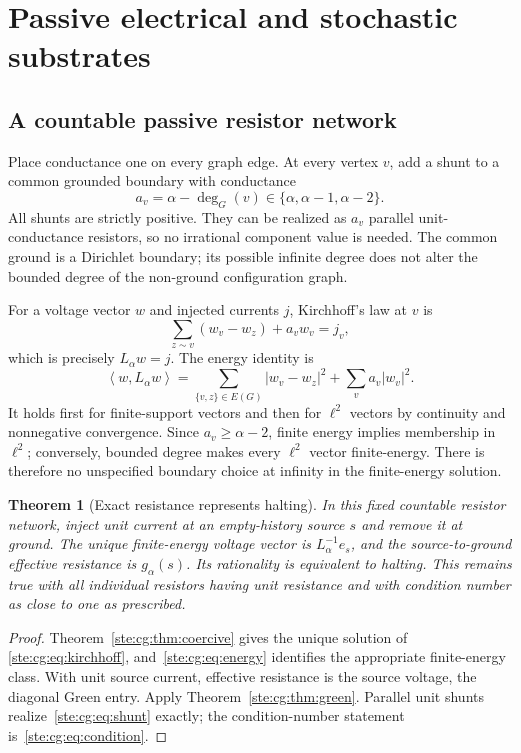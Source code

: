 \documentclass[11pt,letterpaper]{article}
\newtheorem{theorem}{Theorem}[section]
\theoremstyle{definition}
\theoremstyle{remark}
\newcommand{\ip}[2]{\left\langle#1,#2\right\rangle}
\begin{document}
\section{Passive electrical and stochastic substrates}\label{ste:cg:sec:physical}
\subsection{A countable passive resistor network}
Place conductance one on every graph edge. At every vertex $v$, add a
shunt to a common grounded boundary with conductance
\begin{equation}\label{ste:cg:eq:shunt}
 a_v=\alpha-\deg_G(v)\in\{\alpha,\alpha-1,\alpha-2\}.
\end{equation}
All shunts are strictly positive. They can be realized as $a_v$ parallel
unit-conductance resistors, so no irrational component value is needed.
The common ground is a Dirichlet boundary; its possible infinite degree
does not alter the bounded degree of the non-ground configuration graph.

For a voltage vector $w$ and injected currents $j$, Kirchhoff's law at
$v$ is
\begin{equation}\label{ste:cg:eq:kirchhoff}
 \sum_{z\sim v}(w_v-w_z)+a_vw_v=j_v,
\end{equation}
which is precisely $L_\alpha w=j$. The energy identity is
\begin{equation}\label{ste:cg:eq:energy}
 \ip{w}{L_\alpha w}=
 \sum_{\{v,z\}\in E(G)}|w_v-w_z|^2+
 \sum_v a_v|w_v|^2.
\end{equation}
It holds first for finite-support vectors and then for $\ell^2$ vectors
by continuity and nonnegative convergence. Since $a_v\ge\alpha-2$, finite
energy implies membership in $\ell^2$; conversely, bounded degree makes
every $\ell^2$ vector finite-energy. There is therefore no unspecified
boundary choice at infinity in the finite-energy solution.

\begin{theorem}[Exact resistance represents halting]\label{ste:cg:thm:resistance}
In this fixed countable resistor network, inject unit current at an
empty-history source $s$ and remove it at ground. The unique finite-energy
voltage vector is $L_\alpha^{-1}e_s$, and the source-to-ground effective
resistance is $g_\alpha(s)$. Its rationality is equivalent to halting.
This remains true with all individual resistors having unit resistance
and with condition number as close to one as prescribed.
\end{theorem}
\begin{proof}
Theorem~\ref{ste:cg:thm:coercive} gives the unique solution of
\eqref{ste:cg:eq:kirchhoff}, and~\eqref{ste:cg:eq:energy} identifies the appropriate
finite-energy class. With unit source current, effective resistance is
the source voltage, the diagonal Green entry. Apply
Theorem~\ref{ste:cg:thm:green}. Parallel unit shunts realize~\eqref{ste:cg:eq:shunt}
exactly; the condition-number statement is~\eqref{ste:cg:eq:condition}.
\end{proof}
\end{document}
